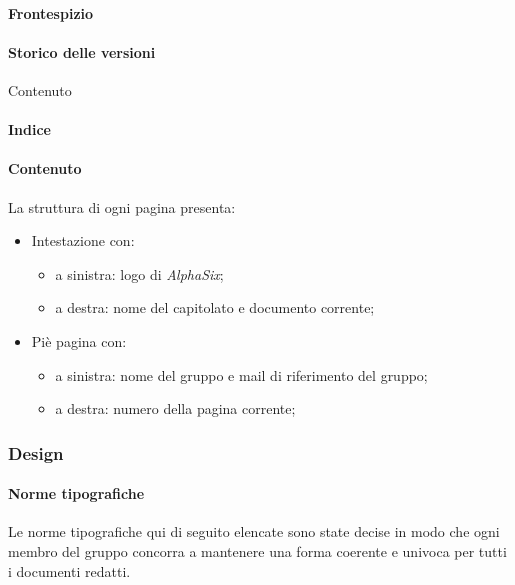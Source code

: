 			\paragraph{Frontespizio}\label{PS:Documentazione:Struttura:Frontespizio}
				

			\paragraph{Storico delle versioni}\label{PS:Documentazione:Struttura:StoricoVersioni}
			Contenuto

			\paragraph{Indice}\label{PS:Documentazione:Struttura:Indice}

			\paragraph{Contenuto}\label{PS:Documentazione:Struttura:Contenuto}
			La struttura di ogni pagina presenta:
			\begin{itemize}
				\item Intestazione con:
				\begin{itemize}
					\item a sinistra: logo di \textit{AlphaSix};
					\item a destra: nome del capitolato e documento corrente;
				\end{itemize}
				\item Piè pagina con:
				\begin{itemize}
					\item a sinistra: nome del gruppo e mail di riferimento del gruppo;
					\item a destra: numero della pagina corrente;
				\end{itemize}
			\end{itemize}


		\subsubsection{Design}\label{PS:Documentazione:Design}

			\paragraph{Norme tipografiche}\label{PS:Documentazione:Design:NormeT}
			Le norme tipografiche qui di seguito elencate sono state decise in modo che ogni membro del gruppo concorra a mantenere una forma coerente e univoca per tutti i documenti redatti.

